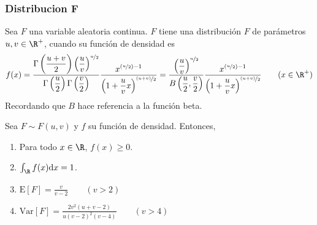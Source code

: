 \subsubsection{Distribucion F}

\begin{Def}
  Sea $F$ una variable aleatoria continua. $F$ tiene una distribución
  $F$ de parámetros $u,v\in\R^+$, cuando su función de densidad es
  \[f(x)=
  \dfrac{\Gamma\left(\frac{u+v}{2}\right)\left(\frac{u}{v}\right)^{\nicefrac{u}{2}}}
  {\Gamma\left(\frac{u}{2}\right)\Gamma\left(\frac{v}{2}\right)}
  \dfrac{x^{(\nicefrac{u}{2})-1}}
  {\left(1 + \frac{u}{v}x\right)^{\nicefrac{(u+v)}{2}}}
  =
  \dfrac{\left(\frac{u}{v}\right)^{\nicefrac{u}{2}}}
    {B\left(\frac{u}{2},\frac{v}{2}\right)}
  \dfrac{x^{(\nicefrac{u}{2})-1}}
    {\left(1 + \frac{u}{v}x\right)^{\nicefrac{(u+v)}{2}}}
  \qquad (x\in\R^+)
  \]
  Recordando que $B$ hace referencia a la función beta.
\end{Def}
\begin{Teo}
  Sea $F\sim F(u,v)$ y $f$ su función de densidad. Entonces,
  \begin{enumerate}
    \item Para todo $x\in\R$, $f(x) \geq 0$.
    \item $\int_{\R}f(x)\mathrm{d}x=1$.
    \item $\text{E}[F]=\frac{v}{v-2} \qquad(v>2)$
    \item $\text{Var}[F]=\frac{2v^2(u+v-2)}{u(v-2)^2(v-4)}\qquad(v>4)$
  \end{enumerate}
\end{Teo}
